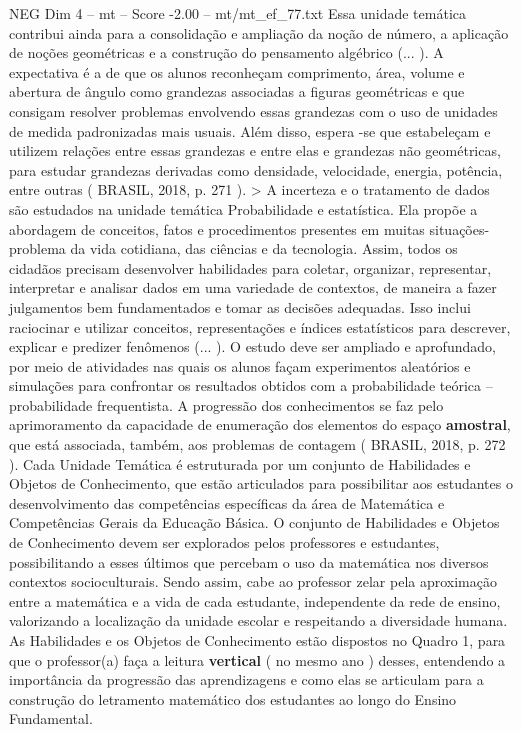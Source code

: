 \begin{textsample}{NEG Dim 4 – mt – Score -2.00 – mt/mt\_ef\_77.txt}
Essa unidade temática contribui ainda para a consolidação e ampliação da noção de número, a aplicação de noções geométricas e a construção do pensamento algébrico (... ).
A expectativa é a de que os alunos reconheçam comprimento, área, volume e abertura de ângulo como grandezas associadas a figuras geométricas e que consigam resolver problemas envolvendo essas grandezas com o uso de unidades de medida padronizadas mais usuais.
Além disso, espera -se que estabeleçam e utilizem relações entre essas grandezas e entre elas e grandezas não geométricas, para estudar grandezas derivadas como densidade, velocidade, energia, potência, entre outras ( BRASIL, 2018, p. 271 ). > A incerteza e o tratamento de dados são estudados na unidade temática Probabilidade e estatística.
Ela propõe a abordagem de conceitos, fatos e procedimentos presentes em muitas situações-problema da vida cotidiana, das ciências e da tecnologia.
Assim, todos os cidadãos precisam desenvolver habilidades para coletar, organizar, representar, interpretar e analisar dados em uma variedade de contextos, de maneira a fazer julgamentos bem fundamentados e tomar as decisões adequadas.
Isso inclui raciocinar e utilizar conceitos, representações e índices estatísticos para descrever, explicar e predizer fenômenos (... ).
O estudo deve ser ampliado e aprofundado, por meio de atividades nas quais os alunos façam experimentos aleatórios e simulações para confrontar os resultados obtidos com a probabilidade teórica – probabilidade frequentista.
A progressão dos conhecimentos se faz pelo aprimoramento da capacidade de enumeração dos elementos do espaço \textbf{amostral}, que está associada, também, aos problemas de contagem ( BRASIL, 2018, p. 272 ).
Cada Unidade Temática é estruturada por um conjunto de Habilidades e Objetos de Conhecimento, que estão articulados para possibilitar aos estudantes o desenvolvimento das competências específicas da área de Matemática e Competências Gerais da Educação Básica.
O conjunto de Habilidades e Objetos de Conhecimento devem ser explorados pelos professores e estudantes, possibilitando a esses últimos que percebam o uso da matemática nos diversos contextos socioculturais.
Sendo assim, cabe ao professor zelar pela aproximação entre a matemática e a vida de cada estudante, independente da rede de ensino, valorizando a localização da unidade escolar e respeitando a diversidade humana.
As Habilidades e os Objetos de Conhecimento estão dispostos no Quadro 1, para que o professor(a) faça a leitura \textbf{vertical} ( no mesmo ano ) desses, entendendo a importância da progressão das aprendizagens e como elas se articulam para a construção do letramento matemático dos estudantes ao longo do Ensino Fundamental.

\end{textsample}
